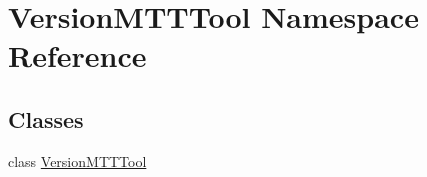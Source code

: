 \hypertarget{namespace_version_m_t_t_tool}{\section{Version\-M\-T\-T\-Tool Namespace Reference}
\label{namespace_version_m_t_t_tool}
}
\subsection*{Classes}
\begin{DoxyCompactItemize}
\item 
class \hyperlink{class_version_m_t_t_tool_1_1_version_m_t_t_tool}{Version\-M\-T\-T\-Tool}
\end{DoxyCompactItemize}

